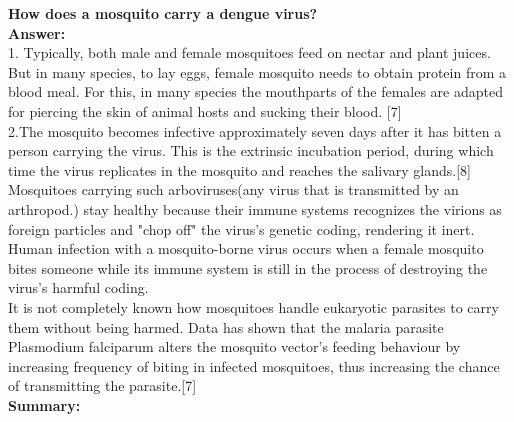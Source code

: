 \documentclass[11pt]{exam}
\begin{document}
\begin{questions}
\question
\label{4. Mosquito: A dengue vector}
\textbf{How does a mosquito carry a dengue virus?} \\
\textbf{Answer:} \\
1. Typically, both male and female mosquitoes feed on nectar and plant juices. But in many species, to lay eggs, female mosquito needs to obtain protein from a blood meal. For this, in many species the mouthparts of the females are adapted for piercing the skin of animal hosts and sucking their blood. [7]\\
2.The mosquito becomes infective approximately seven days after it has bitten a person carrying the virus. This is the extrinsic incubation period, during which time the virus replicates in the mosquito and reaches the salivary glands.[8] \\

Mosquitoes carrying such arboviruses(any virus that is transmitted by an arthropod.) stay healthy because their immune systems recognizes the virions as foreign particles and "chop off" the virus's genetic coding, rendering it inert. Human infection with a mosquito-borne virus occurs when a female mosquito bites someone while its immune system is still in the process of destroying the virus's harmful coding. \\
It is not completely known how mosquitoes handle eukaryotic parasites to carry them without being harmed. Data has shown that the malaria parasite Plasmodium falciparum alters the mosquito vector's feeding behaviour by increasing frequency of biting in infected mosquitoes, thus increasing the chance of transmitting the parasite.[7]\\

\textbf{Summary:} \\
\\ \\


\end{questions}
\end{document}
